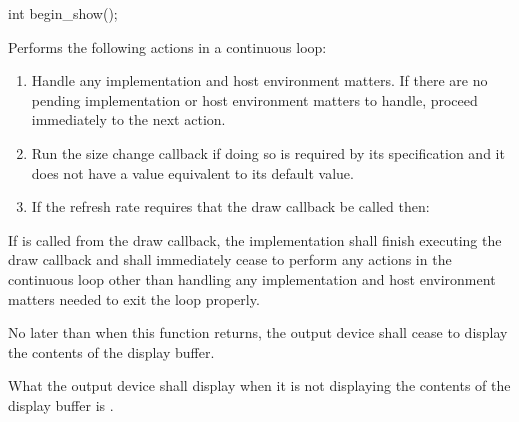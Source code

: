 \begin{itemdecl}
int begin_show();
\end{itemdecl}
\begin{itemdescr}
\pnum
\effects
Performs the following actions in a continuous loop:
\begin{enumerate}
	\item Handle any implementation and host environment matters. If there are no pending implementation or host environment matters to handle, proceed immediately to the next action.
	\item Run the size change callback if doing so is required by its specification and it does not have a value equivalent to its default value.
	\item If the refresh rate requires that the draw callback be called then:
\end{enumerate}

\pnum
If  is called from the draw callback, the implementation shall finish executing the draw callback and shall immediately cease to perform any actions in the continuous loop other than handling any implementation and host environment matters needed to exit the loop properly.

\pnum
No later than when this function returns, the output device shall cease to display the contents of the display buffer.

\pnum
What the output device shall display when it is not displaying the contents of the display buffer is \unspecnorm.


\end{itemdescr}
